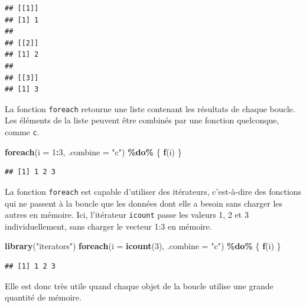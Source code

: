 \documentclass[
  12pt,
  french,
  a4paper,
  extrafontsizes,onecolumn,openright
  ]{memoir}
\newenvironment{Shaded}{\begin{snugshade}}{\end{snugshade}}
\newcommand{\AttributeTok}[1]{\textcolor[rgb]{0.13,0.29,0.53}{#1}}
\newcommand{\DecValTok}[1]{\textcolor[rgb]{0.00,0.00,0.81}{#1}}
\newcommand{\FunctionTok}[1]{\textcolor[rgb]{0.13,0.29,0.53}{\textbf{#1}}}
\newcommand{\NormalTok}[1]{#1}
\newcommand{\SpecialCharTok}[1]{\textcolor[rgb]{0.81,0.36,0.00}{\textbf{#1}}}
\newcommand{\StringTok}[1]{\textcolor[rgb]{0.31,0.60,0.02}{#1}}
\begin{document}
\begin{verbatim}
## [[1]]
## [1] 1
## 
## [[2]]
## [1] 2
## 
## [[3]]
## [1] 3
\end{verbatim}

\normalsize

La fonction \texttt{foreach} retourne une liste contenant les résultats de chaque boucle.
Les éléments de la liste peuvent être combinés par une fonction quelconque, comme \texttt{c}.

\scriptsize

\begin{Shaded}
\begin{Highlighting}[]
\FunctionTok{foreach}\NormalTok{(}\AttributeTok{i =} \DecValTok{1}\SpecialCharTok{:}\DecValTok{3}\NormalTok{, }\AttributeTok{.combine =} \StringTok{"c"}\NormalTok{) }\SpecialCharTok{\%do\%}\NormalTok{ \{}
  \FunctionTok{f}\NormalTok{(i)}
\NormalTok{\}}
\end{Highlighting}
\end{Shaded}

\begin{verbatim}
## [1] 1 2 3
\end{verbatim}

\normalsize

La fonction \texttt{foreach} est capable d'utiliser des itérateurs, c'est-à-dire des fonctions qui ne passent à la boucle que les données dont elle a besoin sans charger les autres en mémoire.
Ici, l'itérateur \texttt{icount} passe les valeurs 1, 2 et 3 individuellement, sans charger le vecteur 1:3 en mémoire.

\scriptsize

\begin{Shaded}
\begin{Highlighting}[]
\FunctionTok{library}\NormalTok{(}\StringTok{"iterators"}\NormalTok{)}
\FunctionTok{foreach}\NormalTok{(}\AttributeTok{i =} \FunctionTok{icount}\NormalTok{(}\DecValTok{3}\NormalTok{), }\AttributeTok{.combine =} \StringTok{"c"}\NormalTok{) }\SpecialCharTok{\%do\%}\NormalTok{ \{}
  \FunctionTok{f}\NormalTok{(i)}
\NormalTok{\}}
\end{Highlighting}
\end{Shaded}

\begin{verbatim}
## [1] 1 2 3
\end{verbatim}

\normalsize

Elle est donc très utile quand chaque objet de la boucle utilise une grande quantité de mémoire.
\end{document}
